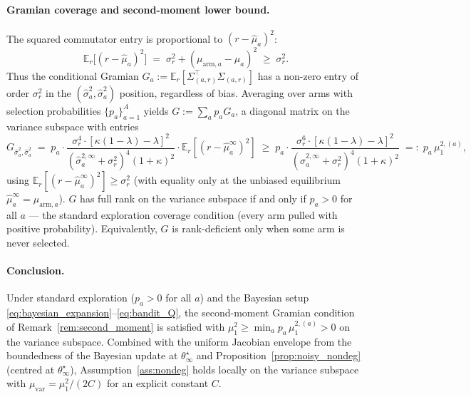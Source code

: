 \documentclass[12pt,a4paper]{article}
\begin{document}
\paragraph{Gramian coverage and second-moment lower bound.}
The squared commutator entry is proportional to $(r - \hat\mu_a)^2$:
\[
  \mathbb{E}_r\!\bigl[(r - \hat\mu_a)^2\bigr]
  \;=\; \sigma_r^2 + (\mu_{\mathrm{arm},a} - \hat\mu_a)^2
  \;\geq\; \sigma_r^2.
\]
Thus the conditional Gramian
$G_a := \mathbb{E}_r[\Sigma_{(a,r)}^\top \Sigma_{(a,r)}]$ has a non-zero
entry of order $\sigma_r^2$ in the $(\hat\sigma_a^2, \hat\sigma_a^2)$
position, regardless of bias. Averaging over arms with selection
probabilities $\{p_a\}_{a=1}^A$ yields
$G := \sum_a p_a G_a$, a diagonal matrix on the variance subspace with
entries
\[
  G_{\hat\sigma_a^2, \hat\sigma_a^2}
  \;=\; p_a \cdot \frac{\sigma_r^4 \cdot [\kappa(1-\lambda) - \lambda]^2}
                                  {(\hat\sigma_a^{2,\infty} + \sigma_r^2)^4 (1+\kappa)^2}
              \cdot \mathbb{E}_r[(r - \hat\mu_a^\infty)^2]
  \;\geq\; p_a \cdot \frac{\sigma_r^6 \cdot [\kappa(1-\lambda) - \lambda]^2}
                                  {(\hat\sigma_a^{2,\infty} + \sigma_r^2)^4 (1+\kappa)^2}
  \;=:\; p_a\, \mu_1^{2,(a)},
\]
using $\mathbb{E}_r[(r - \hat\mu_a^\infty)^2] \geq \sigma_r^2$ (with equality
only at the unbiased equilibrium $\hat\mu_a^\infty = \mu_{\mathrm{arm},a}$).
$G$ has full rank on the variance subspace if and only if $p_a > 0$ for all
$a$ — the standard exploration coverage condition (every arm pulled with
positive probability). Equivalently, $G$ is rank-deficient only when some
arm is never selected.

\paragraph{Conclusion.}
Under standard exploration ($p_a > 0$ for all $a$) and the Bayesian setup
\eqref{eq:bayesian_expansion}--\eqref{eq:bandit_Q}, the second-moment Gramian
condition of Remark~\ref{rem:second_moment} is satisfied with
$\mu_1^2 \geq \min_a p_a\, \mu_1^{2,(a)} > 0$ on the variance subspace.
Combined with the uniform Jacobian envelope from the boundedness of the
Bayesian update at $\theta^\star_\infty$ and
Proposition~\ref{prop:noisy_nondeg} (centred at $\theta^\star_\infty$),
Assumption~\ref{ass:nondeg} holds locally on the variance subspace with
$\mu_{\mathrm{var}} = \mu_1^2/(2C)$ for an explicit constant $C$.
\end{document}
